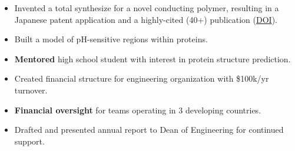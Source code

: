 \documentclass[margin]{res}
\begin{document}
\begin{sloppypar}
\begin{resume}
\begin{itemize}
    \item Invented a total synthesize for a novel conducting polymer, resulting in a Japanese patent application and a highly-cited (40+) publication (\href{http://pubs.acs.org/doi/abs/10.1021/ja107444m}{DOI}).
\end{itemize}

\begin{itemize}
    \item Built a model of pH-sensitive regions within proteins.
    \item \textbf{Mentored} high school student with interest in protein structure prediction.
\end{itemize}


{}
\begin{itemize}
        \item Created financial structure for engineering organization with \$100k/yr turnover. 
        \item \textbf{Financial oversight} for teams operating in 3 developing countries.
        \item Drafted and presented annual report to Dean of Engineering for continued support. 
\end{itemize}


\end{resume}
\end{sloppypar}
\end{document}
